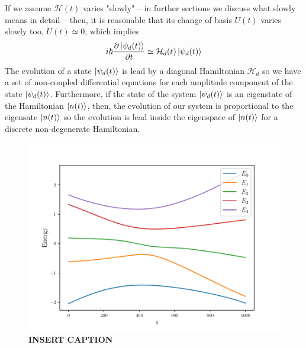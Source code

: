 If we assume $\mathcal{H}(t)$ varies "slowly" -- in further sections we discuss what slowly means in detail -- then, it is reasonable that its change of basis $U(t)$ varies slowly too, $\dot{U}(t) \simeq 0$, which implies
\begin{equation}
    i\hbar  \frac{\partial \ket{\psi_{d}(t)}}{\partial t} \simeq \mathcal{H}_{d}(t)\ket{\psi_{d}(t)}
\end{equation}
The evolution of a state $\ket{\psi_{d}(t)}$ is lead by a diagonal Hamiltonian $\mathcal{H}_{d}$ so we have a set of non-coupled differential equations for each amplitude component of the state $\ket{\psi_{d}(t)}$. Furthermore, if the state of the system $\ket{\psi_{d}(t)}$ is an eigenstate of the Hamiltonian $\ket{n(t)}$, then, the evolution of our system is proportional to the eigensate $\ket{n(t)}$ so the evolution is lead inside the eigenspace of $\ket{n(t)}$ for a discrete non-degenerate Hamiltonian.
\begin{figure}[h]
    \centering
    \includegraphics[width=\textwidth]{Figures/Eigenenergies.pdf}
    \caption{\textbf{INSERT CAPTION}}
    \label{fig:Eigenenergies}
\end{figure}
